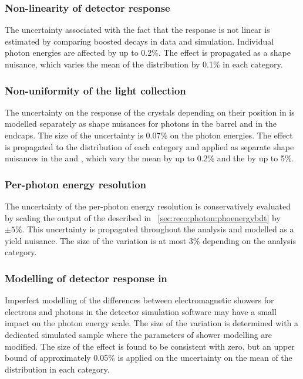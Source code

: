 \subsubsection{Non-linearity of detector response}
The uncertainty associated with the fact that the \ECAL response is not linear is estimated by comparing boosted \Zee decays in data and simulation. Individual photon energies are affected by up to 0.2\%. The effect is propagated as a shape nuisance, which varies the mean of the \mgg distribution by 0.1\% in each category.

\subsubsection{Non-uniformity of the light collection}
The uncertainty on the response of the \ECAL crystals depending on their position in \eta is modelled separately as shape nuisances for photons in the barrel and in the endcaps. The size of the uncertainty is 0.07\% on the photon energies. The effect is propagated to the \mgg distribution of each category and applied as separate shape nuisances in the \EE and \EB, which vary the mean by up to 0.2\% and the \effSigma by up to 5\%.

\subsubsection{Per-photon energy resolution}
The uncertainty of the per-photon energy resolution is conservatively evaluated by scaling the output of the \PhoEnergyBdt described in \Sec~\ref{sec:reco:photon:phoenergybdt} by $\pm5\%$. This uncertainty is propagated throughout the analysis and modelled as a yield nuisance. The size of the variation is at most 3\% depending on the analysis category.


\subsubsection{Modelling of detector response in \Geant}
Imperfect modelling of the differences between electromagnetic showers for electrons and photons in the detector simulation software \Geant may have a small impact on the photon energy scale. The size of the variation is determined with a dedicated simulated sample where the parameters of shower modelling are modified. The size of the effect is found to be consistent with zero, but an upper bound of approximately 0.05\% is applied on the uncertainty on the mean of the \mgg distribution in each category.

